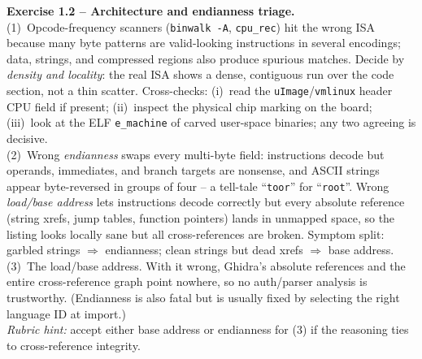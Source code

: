 \documentclass[11pt,a4paper]{article}
\begin{document}
\begin{solutionbox}
\textbf{Exercise 1.2 -- Architecture and endianness triage.}\\[2pt]
(1)~Opcode-frequency scanners (\texttt{binwalk -A}, \texttt{cpu\_rec}) hit the wrong ISA because
many byte patterns are valid-looking instructions in several encodings; data, strings, and
compressed regions also produce spurious matches. Decide by \emph{density and locality}: the
real ISA shows a dense, contiguous run over the code section, not a thin scatter. Cross-checks:
(i)~read the \texttt{uImage}/\texttt{vmlinux} header CPU field if present; (ii)~inspect the
physical chip marking on the board; (iii)~look at the ELF \texttt{e\_machine} of carved
user-space binaries; any two agreeing is decisive.\\[2pt]
(2)~Wrong \emph{endianness} swaps every multi-byte field: instructions decode but operands,
immediates, and branch targets are nonsense, and ASCII strings appear byte-reversed in groups of
four -- a tell-tale ``\texttt{toor}'' for ``\texttt{root}''. Wrong \emph{load/base address} lets
instructions decode correctly but every absolute reference (string xrefs, jump tables, function
pointers) lands in unmapped space, so the listing looks locally sane but all cross-references are
broken. Symptom split: garbled strings $\Rightarrow$ endianness; clean strings but dead xrefs
$\Rightarrow$ base address.\\[2pt]
(3)~The load/base address. With it wrong, Ghidra's absolute references and the entire
cross-reference graph point nowhere, so no auth/parser analysis is trustworthy. (Endianness is
also fatal but is usually fixed by selecting the right language ID at import.)\\[2pt]
\emph{Rubric hint:} accept either base address or endianness for (3) if the reasoning ties to
cross-reference integrity.
\end{solutionbox}
\end{document}
